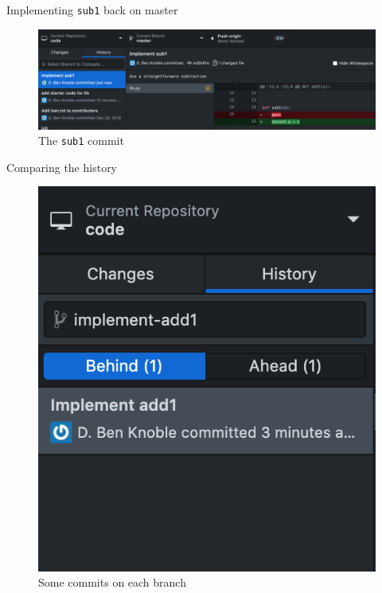 \documentclass{beamer}
\theoremstyle{example}
\begin{document}
\begin{frame}{Implementing \texttt{sub1} back on master}
    \begin{figure}
        \includegraphics[scale=0.4]{img/sub1}
        \caption{The \texttt{sub1} commit}
    \end{figure}
\end{frame}

\begin{frame}{Comparing the history}
    \begin{figure}
        \includegraphics[scale=0.4]{img/comparing}
        \caption{Some commits on each branch}
    \end{figure}
\end{frame}

\begin{frame}
\end{frame}
\end{document}
